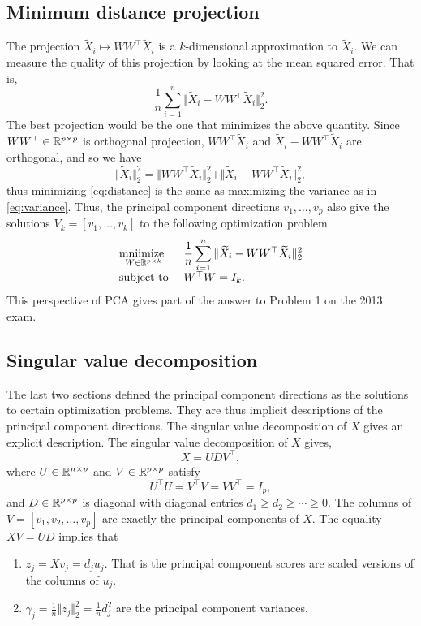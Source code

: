 \subsection{Minimum distance projection}

The projection $\widetilde{X}_i \mapsto WW^\top \widetilde{X}_i$ is a $k$-dimensional approximation to $\widetilde{X}_i$. We can measure the quality of this projection by looking at the mean squared error. That is,
\begin{equation}\label{eq:distance}\frac{1}{n}\sum_{i=1}^n \Vert \widetilde{X}_i - WW^\top \widetilde{X}_i \Vert_2^2. \end{equation}
The best projection would be the one that minimizes the above quantity. Since $WW^\top \in \mathbb{R}^{p \times p}$ is orthogonal projection, $WW^\top \widetilde{X}_i$ and $\widetilde{X}_i-WW^\top \widetilde{X}_i$ are orthogonal, and so we have
\[\Vert \widetilde{X}_i\Vert_2^2 = \Vert WW^\top \widetilde{X}_i \Vert_2^2 + \Vert \widetilde{X}_i-WW^\top \widetilde{X}_i \Vert_2^2, \]
thus minimizing \eqref{eq:distance} is the same as maximizing the variance as in \eqref{eq:variance}. Thus, the principal component directions $v_1,\ldots,v_p$ also give the solutions $V_k = [v_1,\ldots,v_k]$ to the following optimization problem
\[\begin{array}{ll}
    \underset{W \in \mathbb{R}^{p \times k}}{\mbox{mniimize }} &\displaystyle{\frac{1}{n}\sum_{i=1}^n \Vert \widetilde{X}_i - WW^\top \widetilde{X}_i \Vert_2^2}\\
    \mbox{subject to }& W^\top W = I_k.
\end{array} \]
This perspective of PCA gives part of the answer to Problem 1 on the 2013 exam.


\subsection{Singular value decomposition}

The last two sections defined the principal component directions as the solutions to certain optimization problems. They are thus implicit descriptions of the principal component directions. The singular value decomposition of $X$ gives an explicit description. The singular value decomposition of $X$ gives,
\[X = UDV^\top, \]
where $U \in \mathbb{R}^{n \times p}$ and $V \in \mathbb{R}^{p \times p}$ satisfy
\[U^\top U = V^\top V = VV^\top = I_p, \]
and $D \in \mathbb{R}^{p \times p}$ is diagonal with diagonal entries $d_1 \ge d_2 \ge \cdots \ge 0$. The columns of $V =[v_1,v_2,\ldots,v_p]$ are exactly the principal components of $X$. The equality $XV = UD$ implies that
\begin{enumerate}
    \item $z_j = Xv_j = d_ju_j$. That is the principal component scores are scaled versions of the columns of $u_j$.
    \item $\gamma_j = \frac{1}{n}\Vert z_j \Vert_2^2 = \frac{1}{n}d_j^2$ are the principal component variances.
\end{enumerate}

